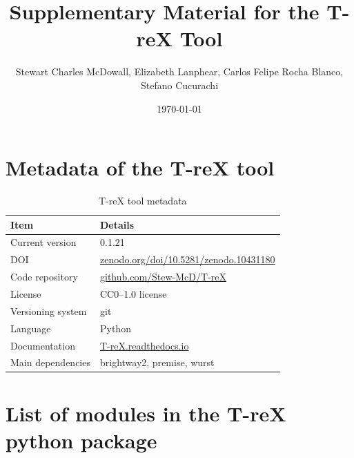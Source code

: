 \documentclass{article}
\begin{document}
\title{Supplementary Material for the T-reX Tool}
\author{Stewart Charles McDowall, Elizabeth Lanphear, Carlos Felipe Rocha Blanco, Stefano Cucurachi}
\date{\today}

\maketitle

\section{Metadata of the T-reX tool}

\begin{table}[h]
    \caption{T-reX tool metadata}\label{tab:metadata}
    \centering
    \begin{tabular}{ll}
    \toprule
    \textbf{Item} & \textbf{Details} \\
    \midrule
    Current version & 0.1.21 \\
    DOI & \url{zenodo.org/doi/10.5281/zenodo.10431180} \\
    Code repository & \url{github.com/Stew-McD/T-reX} \\
    License & CC0--1.0 license \\
    Versioning system & git \\
    Language & Python \\
    Documentation & \url{T-reX.readthedocs.io} \\
    Main dependencies & brightway2, premise, wurst \\
    \bottomrule
    \end{tabular}
\end{table}

\section{List of modules in the T-reX python package}
\end{document}

